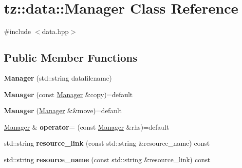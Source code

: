 \hypertarget{classtz_1_1data_1_1_manager}{}\section{tz\+:\+:data\+:\+:Manager Class Reference}
\label{classtz_1_1data_1_1_manager}


{\ttfamily \#include $<$data.\+hpp$>$}

\subsection*{Public Member Functions}
\begin{DoxyCompactItemize}
\item 
\mbox{\label{classtz_1_1data_1_1_manager_a193453bb8103989bc0470c0bc92aaacc}} 
{\bfseries Manager} (std\+::string datafilename)
\item 
\mbox{\label{classtz_1_1data_1_1_manager_a0ff2e0652aff2156ffefe0407c3de01a}} 
{\bfseries Manager} (const \mbox{\hyperlink{classtz_1_1data_1_1_manager}{Manager}} \&copy)=default
\item 
\mbox{\label{classtz_1_1data_1_1_manager_a4d643fbbf4567894eab938269d8b8018}} 
{\bfseries Manager} (\mbox{\hyperlink{classtz_1_1data_1_1_manager}{Manager}} \&\&move)=default
\item 
\mbox{\label{classtz_1_1data_1_1_manager_a941a0cdd736b9d0baebf2ce69f6164bd}} 
\mbox{\hyperlink{classtz_1_1data_1_1_manager}{Manager}} \& {\bfseries operator=} (const \mbox{\hyperlink{classtz_1_1data_1_1_manager}{Manager}} \&rhs)=default
\item 
\mbox{\label{classtz_1_1data_1_1_manager_a2e8da95d6b61f144b27e385c4d5d6e19}} 
std\+::string {\bfseries resource\+\_\+link} (const std\+::string \&resource\+\_\+name) const
\item 
\mbox{\label{classtz_1_1data_1_1_manager_a5282c9de3f5363f64ff370545b5dc37d}} 
std\+::string {\bfseries resource\+\_\+name} (const std\+::string \&resource\+\_\+link) const
\item 
\mbox{\label{classtz_1_1data_1_1_manager_a84a45f4d8a495b3d9e73fb65ecb9bdbd}} 

\end{DoxyCompactItemize}
